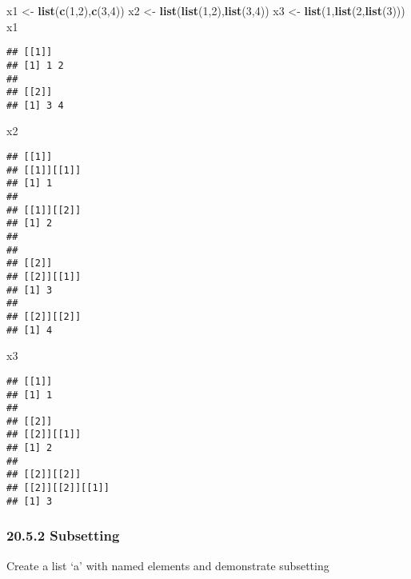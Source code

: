 \documentclass[
]{article}
\newenvironment{Shaded}{\begin{snugshade}}{\end{snugshade}}
\newcommand{\DecValTok}[1]{\textcolor[rgb]{0.00,0.00,0.81}{#1}}
\newcommand{\FunctionTok}[1]{\textcolor[rgb]{0.13,0.29,0.53}{\textbf{#1}}}
\newcommand{\NormalTok}[1]{#1}
\newcommand{\OtherTok}[1]{\textcolor[rgb]{0.56,0.35,0.01}{#1}}
\begin{document}
\begin{Shaded}
\begin{Highlighting}[]
\NormalTok{x1 }\OtherTok{\textless{}{-}} \FunctionTok{list}\NormalTok{(}\FunctionTok{c}\NormalTok{(}\DecValTok{1}\NormalTok{,}\DecValTok{2}\NormalTok{),}\FunctionTok{c}\NormalTok{(}\DecValTok{3}\NormalTok{,}\DecValTok{4}\NormalTok{))}
\NormalTok{x2 }\OtherTok{\textless{}{-}} \FunctionTok{list}\NormalTok{(}\FunctionTok{list}\NormalTok{(}\DecValTok{1}\NormalTok{,}\DecValTok{2}\NormalTok{),}\FunctionTok{list}\NormalTok{(}\DecValTok{3}\NormalTok{,}\DecValTok{4}\NormalTok{))}
\NormalTok{x3 }\OtherTok{\textless{}{-}} \FunctionTok{list}\NormalTok{(}\DecValTok{1}\NormalTok{,}\FunctionTok{list}\NormalTok{(}\DecValTok{2}\NormalTok{,}\FunctionTok{list}\NormalTok{(}\DecValTok{3}\NormalTok{)))}
\NormalTok{x1}
\end{Highlighting}
\end{Shaded}

\begin{verbatim}
## [[1]]
## [1] 1 2
## 
## [[2]]
## [1] 3 4
\end{verbatim}

\begin{Shaded}
\begin{Highlighting}[]
\NormalTok{x2}
\end{Highlighting}
\end{Shaded}

\begin{verbatim}
## [[1]]
## [[1]][[1]]
## [1] 1
## 
## [[1]][[2]]
## [1] 2
## 
## 
## [[2]]
## [[2]][[1]]
## [1] 3
## 
## [[2]][[2]]
## [1] 4
\end{verbatim}

\begin{Shaded}
\begin{Highlighting}[]
\NormalTok{x3}
\end{Highlighting}
\end{Shaded}

\begin{verbatim}
## [[1]]
## [1] 1
## 
## [[2]]
## [[2]][[1]]
## [1] 2
## 
## [[2]][[2]]
## [[2]][[2]][[1]]
## [1] 3
\end{verbatim}

\hypertarget{subsetting-2}{%
\subsubsection{20.5.2 Subsetting}\label{subsetting-2}}

Create a list `a' with named elements and demonstrate subsetting
\end{document}

